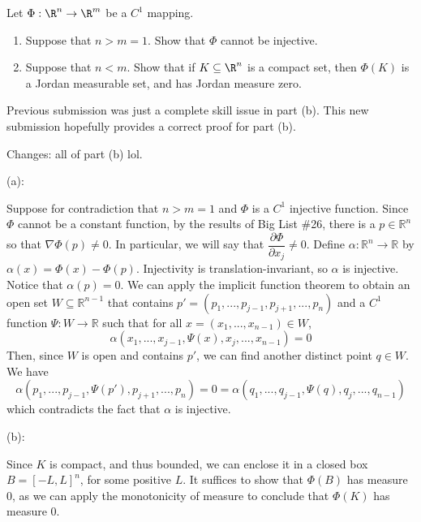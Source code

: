 \documentclass{../../../tex-setup/eh-homework}
\begin{document}
    \newpage
    \begin{question}{34}
        Let $\Phi:\R^n\rightarrow\R^m$ be a $C^1$ mapping.
        \begin{enumerate}[label=(\alph*)]
            \item Suppose that $n>m = 1$. Show that $\Phi$ cannot be injective.
            
            \item Suppose that $n<m$. Show that if $K\subseteq\R^n$ is a compact set, then $\Phi(K)$ is a Jordan measurable set, and has Jordan measure zero.
        \end{enumerate}
        \color{pastelgreen}
        Previous submission was just a complete skill issue in part (b). This new submission hopefully provides a correct proof for part (b).

        Changes: all of part (b) lol.
        \tcblower
        \ 
        
        (a):

        Suppose for contradiction that \(n > m = 1\) and \(\Phi\) is a \(C^1\) injective function. Since \(\Phi\) cannot be a constant function, by the results of Big List \#26, there is a \(p \in \mathbb{R}^n\) so that \(\nabla \Phi(p) \neq 0\). In particular, we will say that \(\dfrac{\partial \Phi}{\partial x_j} \neq 0\). Define \(\alpha : \mathbb{R}^n \to \mathbb{R}\) by \(\alpha (x) = \Phi (x) - \Phi (p)\). Injectivity is translation-invariant, so \(\alpha\) is injective. Notice that \(\alpha (p) = 0\). We can apply the implicit function theorem to obtain an open set \(W \subseteq \mathbb{R}^{n-1}\) that contains \(p' = (p_1, ..., p_{j-1}, p_{j+1}, ..., p_n)\) and a \(C^1\) function \(\Psi : W \to \mathbb{R}\) such that for all \(x = (x_1, ..., x_{n-1}) \in W\),
        \[
            \alpha (x_1, ..., x_{j-1}, \Psi (x), x_{j}, ..., x_{n-1}) = 0
        \]
        Then, since \(W\) is open and contains \(p'\), we can find another distinct point \(q \in W\). We have
        \[
            \alpha (p_1, ..., p_{j-1}, \Psi (p'), p_{j+1}, ..., p_n) = 0 = \alpha (q_1, ..., q_{j-1}, \Psi (q), q_{j}, ..., q_{n-1})
        \]
        which contradicts the fact that \(\alpha\) is injective.

        \medskip

        (b):

        Since \(K\) is compact, and thus bounded, we can enclose it in a closed box \(B = [-L, L]^n\), for some positive \(L\). It suffices to show that \(\Phi (B)\) has measure 0, as we can apply the monotonicity of measure to conclude that \(\Phi (K)\) has measure 0.


\end{question}
\end{document}
